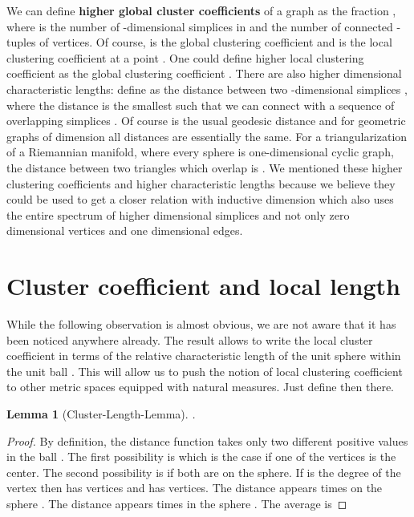 \documentclass[12pt]{amsart}
\newtheorem{lemma}[thm]{Lemma}
\theoremstyle{definition}
\begin{document}
We can define {\bf higher global cluster coefficients}  of a graph 
as the fraction , where  is the number of -dimensional
simplices  in  and  the number of connected -tuples of 
vertices. Of course,  is the global clustering coefficient
and  is the local clustering coefficient at a point . 
One could define higher local clustering coefficient  as the 
global clustering coefficient . There are also higher dimensional 
characteristic lengths: define  as the distance between two 
-dimensional simplices , where the distance is the smallest
 such that we can connect  with a sequence  
of overlapping  simplices . Of course  is the usual
geodesic distance and for geometric graphs of dimension  all distances
 are essentially the same. For a triangularization of a Riemannian 
manifold, where every sphere is one-dimensional cyclic graph, the distance
between two triangles which overlap is .
We mentioned these higher clustering coefficients and higher characteristic lengths
because we believe they could be used to get a closer relation with 
inductive dimension which also uses the entire spectrum of higher dimensional 
simplices and not only zero dimensional vertices and one dimensional edges. 

\section{Cluster coefficient and local length}

While the following observation is almost obvious, we are not aware
that it has been noticed anywhere already. The result allows to write the 
local cluster coefficient in terms of the relative characteristic length  
of the unit sphere  within the unit ball . This will allow
us to push the notion of local clustering coefficient to other metric spaces 
equipped with natural measures. Just define then  there. 

\begin{lemma}[Cluster-Length-Lemma]
. 
\end{lemma}

\begin{proof}
By definition, the distance function takes only two different positive values in the ball . 
The first possibility is  which is the case if one of the vertices is the center.
The second possibility is  if both  are on the sphere. 
If  is the degree of the vertex  then  has  vertices and  has
 vertices. The distance  appears  times on the sphere . 
The distance  appears  times in the sphere . The average is 

\end{proof} 
\end{document}
